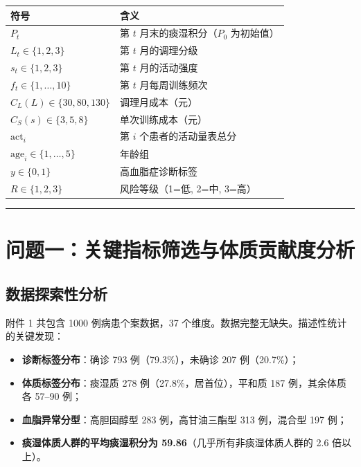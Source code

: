 \documentclass{MathorCupmodeling}
\providecommand{\tightlist}{%
  \setlength{\itemsep}{0pt}\setlength{\parskip}{0pt}}
\begin{document}
\begin{longtable}[]{@{}ll@{}}
\toprule\noalign{}
符号 & 含义 \\
\midrule\noalign{}
\endhead
\bottomrule\noalign{}
\endlastfoot
\(P_t\) & 第 \(t\) 月末的痰湿积分（\(P_0\) 为初始值） \\
\(L_t \in \{1,2,3\}\) & 第 \(t\) 月的调理分级 \\
\(s_t \in \{1,2,3\}\) & 第 \(t\) 月的活动强度 \\
\(f_t \in \{1,\dots,10\}\) & 第 \(t\) 月每周训练频次 \\
\(C_L(L) \in \{30, 80, 130\}\) & 调理月成本（元） \\
\(C_S(s) \in \{3, 5, 8\}\) & 单次训练成本（元） \\
\(\text{act}_i\) & 第 \(i\) 个患者的活动量表总分 \\
\(\text{age}_i \in \{1,\dots,5\}\) & 年龄组 \\
\(y \in \{0, 1\}\) & 高血脂症诊断标签 \\
\(R \in \{1, 2, 3\}\) & 风险等级（1=低, 2=中, 3=高） \\
\end{longtable}

\begin{center}\rule{0.5\linewidth}{0.5pt}\end{center}

\section{问题一：关键指标筛选与体质贡献度分析}\label{ux4e09ux95eeux9898ux4e00ux5173ux952eux6307ux6807ux7b5bux9009ux4e0eux4f53ux8d28ux8d21ux732eux5ea6ux5206ux6790}

\subsection{数据探索性分析}\label{ux6570ux636eux63a2ux7d22ux6027ux5206ux6790}

附件 1 共包含 1000 例病患个案数据，37 个维度。数据完整无缺失。描述性统计的关键发现：

\begin{itemize}
\tightlist
\item
  \textbf{诊断标签分布}：确诊 793 例（79.3\%），未确诊 207 例（20.7\%）；
\item
  \textbf{体质标签分布}：痰湿质 278 例（27.8\%，居首位），平和质 187 例，其余体质各 57--90 例；
\item
  \textbf{血脂异常分型}：高胆固醇型 283 例，高甘油三酯型 313 例，混合型 197 例；
\item
  \textbf{痰湿体质人群的平均痰湿积分为 59.86}（几乎所有非痰湿体质人群的 2.6 倍以上）。
\end{itemize}
\end{document}

